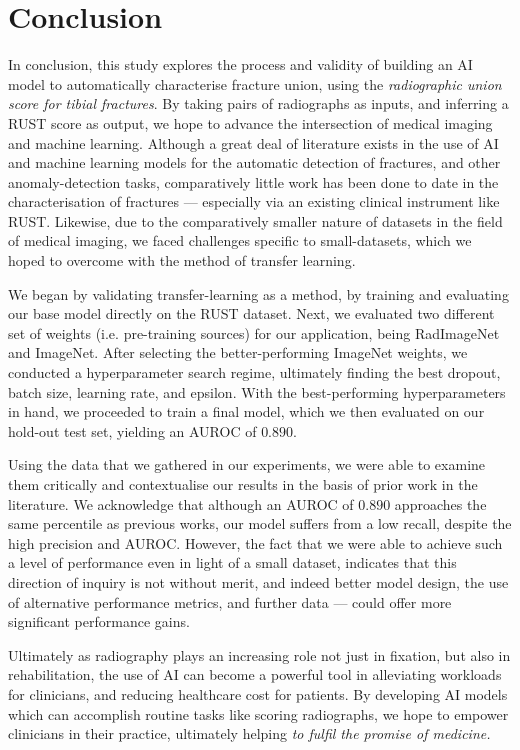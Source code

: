 \chapter{Conclusion}

In conclusion, this study explores the process and validity of building an AI model to automatically characterise fracture union, using the \emph{radiographic union score for tibial fractures}. By taking pairs of radiographs as inputs, and inferring a RUST score as output, we hope to advance the intersection of medical imaging and machine learning. Although a great deal of literature exists in the use of AI and machine learning models for the automatic detection of fractures, and other anomaly-detection tasks, comparatively little work has been done to date in the characterisation of fractures --- especially via an existing clinical instrument like RUST. Likewise, due to the comparatively smaller nature of datasets in the field of medical imaging, we faced challenges specific to small-datasets, which we hoped to overcome with the method of transfer learning. 

We began by validating transfer-learning as a method, by training and evaluating our base model directly on the RUST dataset. Next, we evaluated two different set of weights (i.e. pre-training sources) for our application, being RadImageNet and ImageNet. After selecting the better-performing ImageNet weights, we conducted a hyperparameter search regime, ultimately finding the best dropout, batch size, learning rate, and epsilon. With the best-performing hyperparameters in hand, we proceeded to train a final model, which we then evaluated on our hold-out test set, yielding an AUROC of \(0.890\).

Using the data that we gathered in our experiments, we were able to examine them critically and contextualise our results in the basis of prior work in the literature. We acknowledge that although an AUROC of \(0.890\) approaches the same percentile as previous works, our model suffers from a low recall, despite the high precision and AUROC. However, the fact that we were able to achieve such a level of performance even in light of a small dataset, indicates that this direction of inquiry is not without merit, and indeed better model design, the use of alternative performance metrics, and further data --- could offer more significant performance gains.

Ultimately as radiography plays an increasing role not just in fixation, but also in rehabilitation, the use of AI can become a powerful tool in alleviating workloads for clinicians, and reducing healthcare cost for patients.
By developing AI models which can accomplish routine tasks like scoring radiographs, we hope to empower clinicians in their practice, ultimately helping \emph{to fulfil the promise of medicine.}